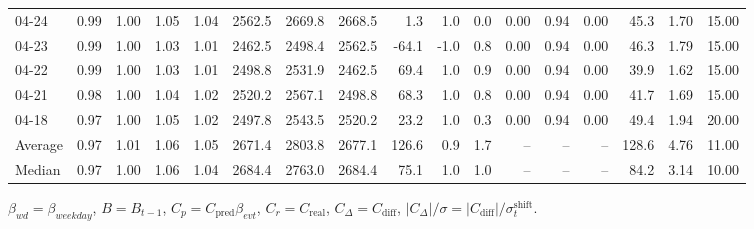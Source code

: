 \begin{threeparttable}
{\begin{tabular}{lrrrrrrrrrrrrrrrr}
  04-24 &         0.99 &           1.00 &          1.05 &          1.04 & 2562.5 & 2669.8 & 2668.5 &        1.3 &                      1.0 &                 0.0 &       0.00 &      0.94 &           0.00 &             45.3 &            1.70 &                  15.00 \\
  04-23 &         0.99 &           1.00 &          1.03 &          1.01 & 2462.5 & 2498.4 & 2562.5 &      -64.1 &                     -1.0 &                 0.8 &       0.00 &      0.94 &           0.00 &             46.3 &            1.79 &                  15.00 \\
  04-22 &         0.99 &           1.00 &          1.03 &          1.01 & 2498.8 & 2531.9 & 2462.5 &       69.4 &                      1.0 &                 0.9 &       0.00 &      0.94 &           0.00 &             39.9 &            1.62 &                  15.00 \\
  04-21 &         0.98 &           1.00 &          1.04 &          1.02 & 2520.2 & 2567.1 & 2498.8 &       68.3 &                      1.0 &                 0.8 &       0.00 &      0.94 &           0.00 &             41.7 &            1.69 &                  15.00 \\
  04-18 &         0.97 &           1.00 &          1.05 &          1.02 & 2497.8 & 2543.5 & 2520.2 &       23.2 &                      1.0 &                 0.3 &       0.00 &      0.94 &           0.00 &             49.4 &            1.94 &                  20.00 \\
Average &         0.97 &           1.01 &          1.06 &          1.05 & 2671.4 & 2803.8 & 2677.1 &      126.6 &                      0.9 &                 1.7 &         -- &        -- &             -- &            128.6 &            4.76 &                  11.00 \\
 Median &         0.97 &           1.00 &          1.06 &          1.04 & 2684.4 & 2763.0 & 2684.4 &       75.1 &                      1.0 &                 1.0 &         -- &        -- &             -- &             84.2 &            3.14 &                  10.00 \\
\bottomrule
\end{tabular}
}
\begin{tablenotes}\footnotesize
\item $\beta_{wd}=\beta_{weekday}$, $B=B_{t-1}$,
$C_p=C_{\text{pred}}\beta_{evt}$, $C_r=C_{\text{real}}$,
$C_\Delta=C_{\text{diff}}$, $|C_\Delta|/\sigma=|C_{\text{diff}}|/\sigma_t^{\text{shift}}$.
\end{tablenotes}
\end{threeparttable}
\endgroup
